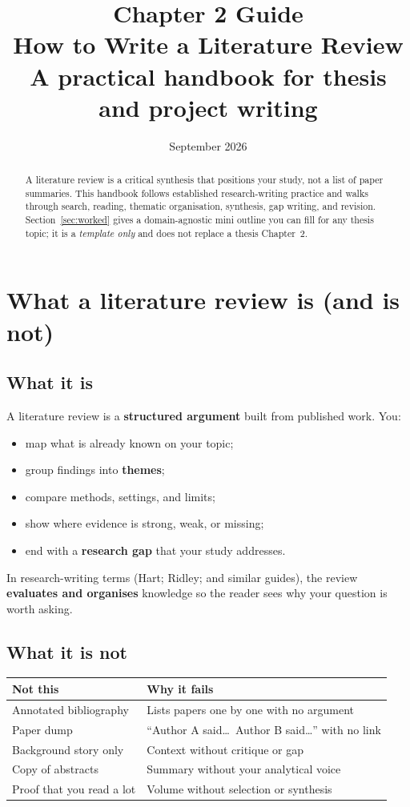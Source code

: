 \documentclass[11pt,a4paper]{article}
\title{\textbf{Chapter 2 Guide}\\[0.35em]
\large How to Write a Literature Review\\[0.25em]
\normalsize A practical handbook for thesis and project writing}
\author{}
\date{September 2026}
\begin{document}
\maketitle

\begin{abstract}
\noindent
A literature review is a critical synthesis that positions your study, not a list of paper summaries.
This handbook follows established research-writing practice and walks through search, reading, thematic organisation, synthesis, gap writing, and revision.
Section~\ref{sec:worked} gives a domain-agnostic mini outline you can fill for any thesis topic; it is a \emph{template only} and does not replace a thesis Chapter~2.
\end{abstract}

\tableofcontents
\newpage

\section{What a literature review is (and is not)}

\subsection{What it is}
A literature review is a \textbf{structured argument} built from published work. You:
\begin{itemize}
  \item map what is already known on your topic;
  \item group findings into \textbf{themes};
  \item compare methods, settings, and limits;
  \item show where evidence is strong, weak, or missing;
  \item end with a \textbf{research gap} that your study addresses.
\end{itemize}
In research-writing terms (Hart; Ridley; and similar guides), the review \textbf{evaluates and organises} knowledge so the reader sees why your question is worth asking.

\subsection{What it is not}
\begin{center}
\begin{tabular}{@{}p{}p{}@{}}
\toprule
\textbf{Not this} & \textbf{Why it fails} \\
\midrule
Annotated bibliography & Lists papers one by one with no argument \\
Paper dump & ``Author A said\ldots\ Author B said\ldots'' with no link \\
Background story only & Context without critique or gap \\
Copy of abstracts & Summary without your analytical voice \\
Proof that you read a lot & Volume without selection or synthesis \\
\bottomrule
\end{tabular}
\end{center}
\end{document}
